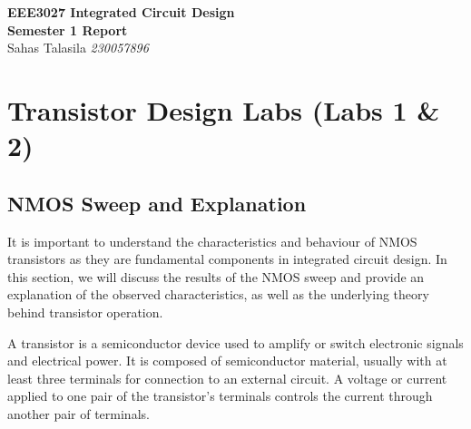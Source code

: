 \documentclass[a4paper,12pt]{article}
\begin{document}
\begin{titlepage}
    \centering
    \vspace*{2cm}
    \Huge{\textbf{EEE3027 Integrated Circuit Design}}\\[0.5cm]
    \Large{\textbf{Semester 1 Report}}\\ 
    \Large{Sahas Talasila \textit{230057896}}
    \vfill
\end{titlepage}

\tableofcontents
\newpage

\begin{abstract}
This report documents the results and explanations of the laboratory exercises conducted as part of the EEE3027 Integrated Circuit Design course.
\begin{enumerate}
  \item \href{URL}{text}
  \item \href{URL}{text}
  \item \href{URL}{text}
  \item \href{URL}{text}
  \item \href{URL}{text}
\end{enumerate}
\end{abstract}

\section{Transistor Design Labs \- (Labs 1 \& 2)}

\subsection{NMOS Sweep and Explanation}

It is important to understand the characteristics and behaviour of NMOS transistors as they are fundamental components in integrated circuit design. 
In this section, we will discuss the results of the NMOS sweep and provide an explanation of the observed characteristics, as well as the underlying theory behind transistor operation.

A transistor is a semiconductor device used to amplify or switch electronic signals and electrical power. 
It is composed of semiconductor material, usually with at least three terminals for connection to an external circuit. A voltage or current applied to one pair of the transistor's terminals controls the current through another pair of terminals.
\end{document}
